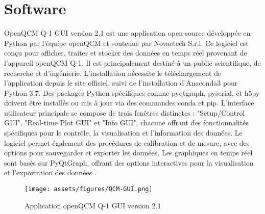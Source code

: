 \section{Software}
OpenQCM Q-1 GUI version 2.1 est une application open-source développée en Python par l'équipe openQCM et soutenue par Novaetech S.r.l. Ce logiciel est conçu pour afficher, traiter et stocker des données en temps réel provenant de l'appareil openQCM Q-1. Il est principalement destiné à un public scientifique, de recherche et d'ingénierie. L'installation nécessite le téléchargement de l'application depuis le site officiel, suivi de l'installation d'Anaconda3 pour Python 3.7. Des packages Python spécifiques comme pyqtgraph, pyserial, et h5py doivent être installés ou mis à jour via des commandes conda et pip. L'interface utilisateur principale se compose de trois fenêtres distinctes : "Setup/Control GUI", "Real-time Plot GUI" et "Info GUI", chacune offrant des fonctionnalités spécifiques pour le contrôle, la visualisation et l'information des données. Le logiciel permet également des procédures de calibration et de mesure, avec des options pour sauvegarder et exporter les données. Les graphiques en temps réel sont basés sur PyQtGraph, offrant des options interactives pour la visualisation et l'exportation des données \cite{manual-openqcmQ1}.

\begin{figure}[H]
    \centering
    \texttt{[image: assets/figures/QCM-GUI.png]}
    \caption{Application openQCM Q-1 GUI version 2.1\cite{manual-openqcmQ1}}
    \label{fig:QCM-GUI}
\end{figure}